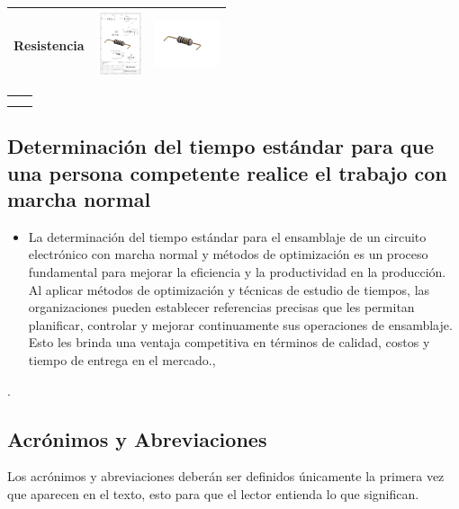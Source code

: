 \begin{itemize}
\begin{table} [H]
\begin{tabular}   {| c |  c |  c | }
        Resistencia & \includegraphics[height=19mm]{1/img/Resistencia.pdf}  & 
       \includegraphics[width=19mm]{1/img/Resistencia_1.pdf} \\
        \hline 
        \end{tabular} 
       
         \label {tab : my_label}  \label {}
          \end{table} 
    
      \begin{tabular}{c|c}
           &  \\
           & 
      \end{tabular}
    
    \end{itemize}
    \subsection{Determinación del tiempo estándar para que una persona competente realice el trabajo con marcha normal}
    \begin{itemize}
    \item La determinación del tiempo estándar para el ensamblaje de un circuito electrónico con marcha normal y métodos de optimización es un proceso fundamental para mejorar la eficiencia y la productividad en la producción. Al aplicar métodos de optimización y técnicas de estudio de tiempos, las organizaciones pueden establecer referencias precisas que les permitan planificar, controlar y mejorar continuamente sus operaciones de ensamblaje. Esto les brinda una ventaja competitiva en términos de calidad, costos y tiempo de entrega en el mercado.\cite{Groover},\cite{Niebel}
    \end{itemize}.
    
    \subsection{Acrónimos y Abreviaciones}
    Los acrónimos y abreviaciones deberán ser definidos únicamente la primera vez que aparecen en el texto, esto para que el lector entienda lo que significan.
    
